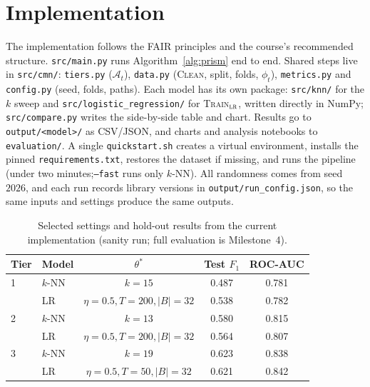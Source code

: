 \documentclass[sigconf,nonacm]{acmart}
\begin{document}
\section{Implementation}
\sloppy
The implementation follows the FAIR principles and the course's recommended structure. \texttt{src/main.py} runs Algorithm~\ref{alg:prism} end to end. Shared steps live in \texttt{src/cmn/}: \texttt{tiers.py} ($\mathcal{A}_t$), \texttt{data.py} (\textsc{Clean}, split, folds, $\phi_t$), \texttt{metrics.py} and \texttt{config.py} (seed, folds, paths). Each model has its own package: \texttt{src/knn/} for the $k$ sweep and \texttt{src/logistic\_regression/} for \textsc{Train}$_{\textsc{lr}}$, written directly in NumPy; \texttt{src/compare.py} writes the side-by-side table and chart. Results go to \texttt{output/<model>/} as CSV/JSON, and charts and analysis notebooks to \texttt{evaluation/}. A single \texttt{quickstart.sh} creates a virtual environment, installs the pinned \texttt{requirements.txt}, restores the dataset if missing, and runs the pipeline (under two minutes;\texttt{--fast} runs only $k$-NN). All randomness comes from seed $2026$, and each run records library versions in \texttt{output/run\_config.json}, so the same inputs and settings produce the same outputs.\par
\fussy

\begin{table}[t]
\caption{Selected settings and hold-out results from the current implementation (sanity run; full evaluation is Milestone~4).}\label{tab:run}
\small\setlength{\tabcolsep}{3.5pt}
\begin{tabular}{@{}llccc@{}}
\toprule
Tier & Model & $\theta^*$ & Test $F_1$ & ROC-AUC\\
\midrule
1 & $k$-NN & $k=15$ & 0.487 & 0.781\\
  & LR & $\eta{=}0.5,T{=}200,|B|{=}32$ & 0.538 & 0.782\\
2 & $k$-NN & $k=13$ & 0.580 & 0.815\\
  & LR & $\eta{=}0.5,T{=}200,|B|{=}32$ & 0.564 & 0.807\\
3 & $k$-NN & $k=19$ & 0.623 & 0.838\\
  & LR & $\eta{=}0.5,T{=}50,|B|{=}32$ & 0.621 & 0.842\\
\bottomrule
\end{tabular}
\end{table}




\clearpage
\appendix
\end{document}
